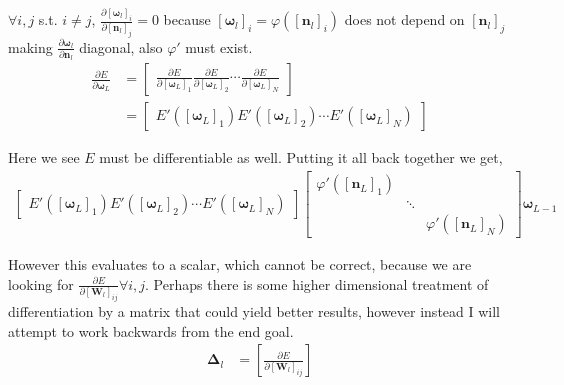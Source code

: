 \documentclass[12pt,letterpaper]{article}
\begin{document}
$\forall i, j$ s.t. $i \neq j$,
$\frac{\partial \left[ \boldsymbol{\omega}_{l} \right]_i}{\partial \left[ \boldsymbol{n}_l\right]_j} = 0 $ 
because 
$[\boldsymbol{\omega}_l]_i = \varphi(\left[\boldsymbol{n}_l\right]_i)$ 
does not depend on 
$\left[\boldsymbol{n}_l\right]_j$ 
making 
$\frac{\partial \boldsymbol{\omega}_{l}}{\partial \boldsymbol{n}_l}$ 
diagonal, also $\varphi'$ must exist.
\begin{align}
\frac{\partial E}{\partial \boldsymbol{\omega}_{L}} 
&= 
\begin{bmatrix}
\frac{\partial E}{\partial \left[ \boldsymbol{\omega}_{L} \right]_1}
\frac{\partial E}{\partial \left[ \boldsymbol{\omega}_{L} \right]_2}
\cdots
\frac{\partial E}{\partial \left[ \boldsymbol{\omega}_{L} \right]_N}
\end{bmatrix} \\
&=
\begin{bmatrix}
E'( \left[ \boldsymbol{\omega}_{L} \right]_1)
E'( \left[ \boldsymbol{\omega}_{L} \right]_2)
\cdots
E'( \left[ \boldsymbol{\omega}_{L} \right]_N)
\end{bmatrix}
\end{align}

Here we see $E$ must be differentiable as well.  Putting it all back together we get,
\begin{align} 
\begin{bmatrix}
E'( \left[ \boldsymbol{\omega}_{L} \right]_1)
E'( \left[ \boldsymbol{\omega}_{L} \right]_2)
\cdots
E'( \left[ \boldsymbol{\omega}_{L} \right]_N)
\end{bmatrix}
\begin{bmatrix}
\varphi'(\left[\boldsymbol{n}_L\right]_1) & \\ 
& \ddots &\\ 
& & \varphi'(\left[\boldsymbol{n}_L\right]_N)
\end{bmatrix}
\boldsymbol{\omega}_{L-1}
\end{align}

However this evaluates to a scalar, which cannot be correct, because we are looking for $\frac{\partial E}{\partial [\boldsymbol{W}_l]_{ij}} \forall i, j$.  Perhaps there is some higher dimensional treatment of differentiation by a matrix that could yield better results, however instead I will attempt to work backwards from the end goal.
\begin{align}
\boldsymbol{\Delta}_l 
&= 
\left[ \frac{\partial E}{\partial [\boldsymbol{W}_{l}]_{ij}} \right]
\end{align}
\end{document}
